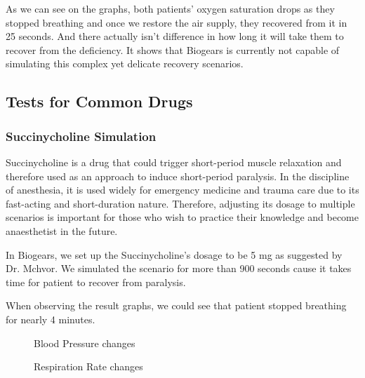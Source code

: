 \documentclass[a4paper]{article}
\begin{document}
As we can see on the graphs, both patients' oxygen saturation drops as they stopped breathing and once we restore the air supply, they recovered from it in 25 seconds. And there actually isn't difference in how long it will take them to recover from the deficiency. It shows that Biogears is currently not capable of simulating this complex yet delicate recovery scenarios.

\subsection{Tests for Common Drugs}

\subsubsection{Succinycholine Simulation}

Succinycholine is a drug that could trigger short-period muscle relaxation and therefore used as an approach to induce short-period paralysis. In the discipline of anesthesia, it is used widely for emergency medicine and trauma care due to its fast-acting and short-duration nature. Therefore, adjusting its dosage to multiple scenarios is important for those who wish to practice their knowledge and become anaesthetist in the future.

In Biogears, we set up the Succinycholine's dosage to be 5 mg as suggested by Dr. Mchvor. We simulated the scenario for  
more than 900 seconds cause it takes time for patient to recover from paralysis.

When observing the result graphs, we could see that patient stopped breathing for nearly 4 minutes. 

\begin{figure}[!htb]\centering
   \begin{minipage}{0.49\textwidth}
     \caption{Blood Pressure changes}
     \label{fig:given 5 mg Succinylcholine}
     
   \end{minipage}
   \begin {minipage}{0.49\textwidth}
     \caption{Respiration Rate changes}
     \label{fig:given 5 mg Succinylcholine}
   \end{minipage}
\end{figure}
\end{document}
